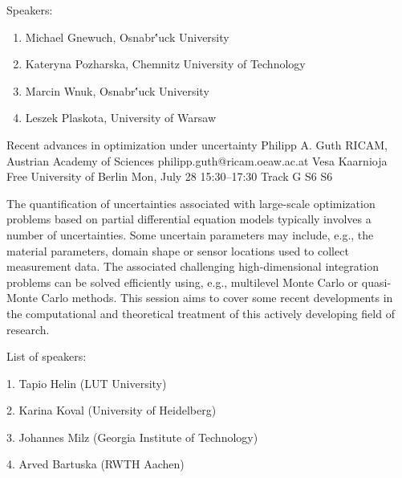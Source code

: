 \begin{talk}
\medskip





Speakers:





\begin{enumerate}


\item Michael Gnewuch, Osnabr\''uck University


\item Kateryna Pozharska, Chemnitz University of Technology


\item Marcin Wnuk, Osnabr\''uck University


\item Leszek Plaskota, University of Warsaw





\end{enumerate}








\end{talk}

\begin{talk}
  {Recent advances in optimization under uncertainty}%
  {Philipp A. Guth}%
  {RICAM, Austrian Academy of Sciences}%
  {philipp.guth@ricam.oeaw.ac.at}%
  {Vesa Kaarnioja}%
  {Free University of Berlin}%
  {Mon, July 28 15:30–17:30 Track G}%
  {S6}%
  {S6}%

The quantification of uncertainties associated with large-scale optimization problems based on partial differential equation models typically involves a number of uncertainties. Some uncertain parameters may include, e.g., the material parameters, domain shape or sensor locations used to collect measurement data. The associated challenging high-dimensional integration problems can be solved efficiently using, e.g., multilevel Monte Carlo or quasi-Monte Carlo methods. This session aims to cover some recent developments in the computational and theoretical treatment of this actively developing field of research.

List of speakers:

1. Tapio Helin (LUT University)

2. Karina Koval (University of Heidelberg)

3. Johannes Milz (Georgia Institute of Technology)

4. Arved Bartuska (RWTH Aachen)

\end{talk}


